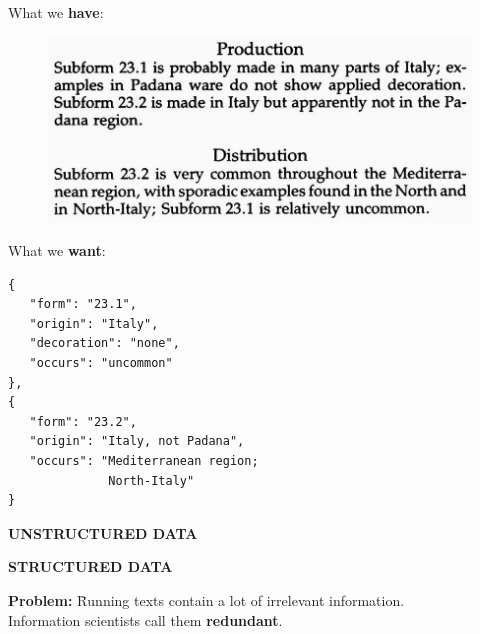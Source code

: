 \documentclass[xcolor=x11names, aspectratio=169,usenames,dvipsnames]{beamer}
\begin{document}
\begin{frame}[fragile]{}
\begin{minipage}[t]{0.45\textwidth}
What we \textbf{have}:\medskip

\begin{figure}
\includegraphics[width=1.0\textwidth]{img/consp_ex.jpg}
\end{figure}
\end{minipage}\hfill\pause
\begin{minipage}[t]{0.45\textwidth}
What we \textbf{want}:\medskip
{\scriptsize
\begin{verbatim}
{
   "form": "23.1",
   "origin": "Italy",
   "decoration": "none",
   "occurs": "uncommon"
},
{
   "form": "23.2",
   "origin": "Italy, not Padana",
   "occurs": "Mediterranean region;
              North-Italy"
}
\end{verbatim}
}
\end{minipage}\pause\medskip

\begin{minipage}[t]{0.45\textwidth}
\begin{center}
\alert{\textbf{UNSTRUCTURED DATA}}
\end{center}
\end{minipage}\hfill
\begin{minipage}[t]{0.45\textwidth}
\begin{center}
\alert{\textbf{STRUCTURED DATA}}
\end{center}
\end{minipage}

\end{frame}

\begin{frame}
\begin{tabbing}
\qquad\textbf{Problem:} \= Running texts contain a lot of \alert{irrelevant information}.\\[.5em]

\> Information scientists call them \textbf{redundant}.
\end{tabbing}
\end{frame}
\end{document}
